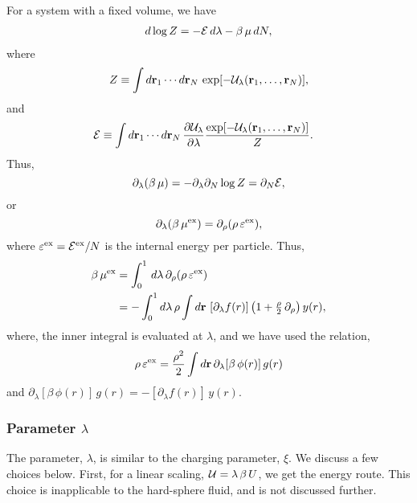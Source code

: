 \documentclass[aip,jcp,reprint,superscriptaddress]{revtex4-1}
\newcommand{\vct}[1]{\mathbf{#1}}
\providecommand{\vr}{} %
\renewcommand{\vr}{\vct{r}}
\begin{document}
For a system with a fixed volume, we have
%
\begin{align*}
d \log Z
=
- \mathcal E \, d\lambda
- \beta \, \mu \, dN,
\end{align*}
%
where
\begin{align*}
Z
\equiv
\int d\vr_1 \cdots d\vr_N \,
\exp[ -\U_\lambda(\vr_1, \dots, \vr_N) ],
\end{align*}
%
and
%
\begin{align*}
\Eps
&\equiv
\int d\vr_1 \cdots d\vr_N \,
\frac{ \partial \U_\lambda }
     { \partial \lambda }
\frac{ \exp[ -\U_\lambda(\vr_1, \dots, \vr_N) ] }
     { Z }.
\end{align*}
%
Thus,
\[
\partial_\lambda ( \beta \, \mu )
=
-\partial_\lambda
\partial_N
\log Z
=
\partial_N \mathcal E,
\]
or
%
\begin{equation}
\partial_\lambda (\beta \, \mu^\mathrm{ex})
=
\partial_\rho (\rho \, \varepsilon^\mathrm{ex}),
\label{eq:mu_e}
\end{equation}
%
where
$\varepsilon^\mathrm{ex} = \mathcal E^\mathrm{ex}/N$
is the internal energy per particle.
%
Thus,
%
\begin{align}
\beta \, \mu^\mathrm{ex}
&=
\int_0^1 \,
  d\lambda \,
  \partial_\rho (\rho \, \eps)
\notag \\
&=
-\int_0^1
  d\lambda \, \rho
  \int d\vr \,
    \left[
      \partial_{\lambda} f(r)
    \right]
    \left(
    1 + \tfrac{ \rho }{ 2 } \, \partial_\rho
    \right)
    y(r),
\label{eq:muex_intlam}
\end{align}
%
where,
the inner integral is evaluated at $\lambda$,
and
we have used the relation\cite{hansen},
%
\begin{equation}
\rho \, \eps
=
\frac{ \rho^2 } { 2 }
\int d\vr \, \partial_\lambda [\beta \, \phi(r)] \, g(r)
\label{eq:e_int}
\end{equation}
%
and
$\partial_\lambda [\beta \, \phi(r)] \, g(r)
 = -[ \partial_\lambda f(r) ] \, y(r)$.




\subsubsection{Parameter $\lambda$}



The parameter, $\lambda$,
is similar to the charging parameter, $\xi$.
%
We discuss a few choices below.
First, for a linear scaling,
$\mathcal U = \lambda \, \beta \, U$,
we get the energy route.
%
This choice is inapplicable
to the hard-sphere fluid,
and is not discussed further.
\end{document}
